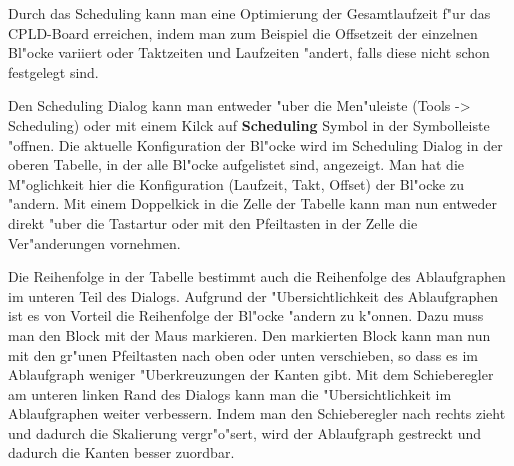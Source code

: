 \documentclass[a4paper,titlepage,12pt,ngerman]{scrbook}
\begin{document}
Durch das Scheduling kann man eine Optimierung der Gesamtlaufzeit f"ur das CPLD-Board erreichen, indem man zum Beispiel die Offsetzeit der einzelnen Bl"ocke variiert oder Taktzeiten und Laufzeiten "andert, falls diese nicht schon festgelegt sind.\par
Den Scheduling Dialog kann man entweder "uber die Men"uleiste (Tools -> Scheduling) oder mit einem Kilck auf {\bf Scheduling} Symbol in der Symbolleiste "offnen.
Die aktuelle Konfiguration der Bl"ocke wird im Scheduling Dialog in der oberen Tabelle, in der alle Bl"ocke aufgelistet sind, angezeigt. Man hat die M"oglichkeit hier die Konfiguration (Laufzeit, Takt, Offset) der Bl"ocke zu "andern. Mit einem Doppelkick in die Zelle der Tabelle kann man nun entweder direkt "uber die Tastartur oder mit den Pfeiltasten in der Zelle die Ver"anderungen vornehmen.\par
Die Reihenfolge in der Tabelle bestimmt auch die Reihenfolge des Ablaufgraphen im unteren Teil des Dialogs. Aufgrund der "Ubersichtlichkeit des Ablaufgraphen ist es von Vorteil die Reihenfolge der Bl"ocke "andern zu k"onnen. Dazu muss man den Block mit der Maus markieren. Den markierten Block kann man nun mit den gr"unen Pfeiltasten nach oben oder unten verschieben, so dass es im Ablaufgraph weniger "Uberkreuzungen der Kanten gibt. Mit dem Schieberegler am unteren linken Rand des Dialogs kann man die "Ubersichtlichkeit im Ablaufgraphen weiter verbessern. Indem man den Schieberegler nach rechts zieht und dadurch die Skalierung vergr"o"sert, wird der Ablaufgraph gestreckt und dadurch die Kanten besser zuordbar.\par
\end{document}
